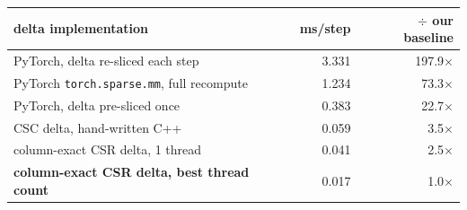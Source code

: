 \begin{tabular}{lrr}
\toprule
delta implementation & ms/step & $\div$ our baseline \\
\midrule
PyTorch, delta re-sliced each step & 3.331 & 197.9$\times$ \\
PyTorch \texttt{torch.sparse.mm}, full recompute & 1.234 & 73.3$\times$ \\
PyTorch, delta pre-sliced once & 0.383 & 22.7$\times$ \\
CSC delta, hand-written C++ & 0.059 & 3.5$\times$ \\
column-exact CSR delta, 1 thread & 0.041 & 2.5$\times$ \\
\textbf{column-exact CSR delta, best thread count} & 0.017 & 1.0$\times$ \\
\bottomrule
\end{tabular}
